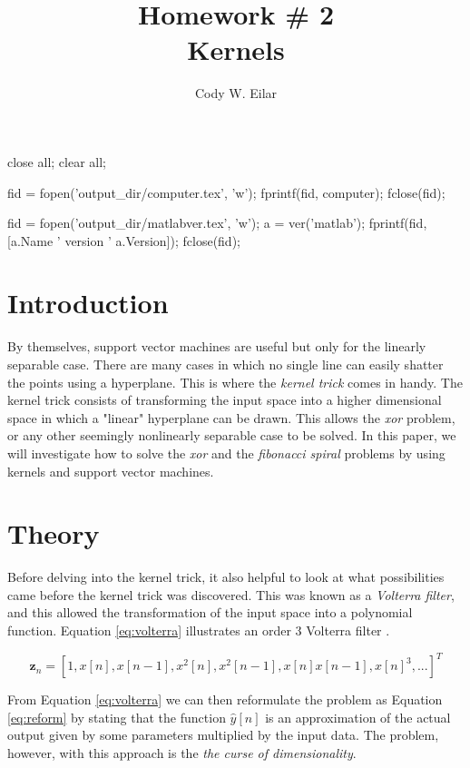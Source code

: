 \documentclass[11pt, twoside]{article}   	%
\title{Homework \# 2 \\ Kernels}
\author{Cody W. Eilar}
\newenvironment{matlab}{\comment}{\endcomment}
\begin{document}
\maketitle


\begin{matlab}
close all; 
clear all;

fid = fopen('output_dir/computer.tex', 'w'); 
fprintf(fid, computer); 
fclose(fid); 

fid = fopen('output_dir/matlabver.tex', 'w'); 
a = ver('matlab'); 
fprintf(fid, [a.Name ' version ' a.Version]); 
fclose(fid); 
\end{matlab}

\section{Introduction} 
By themselves, support vector machines are useful but only for the linearly separable case. There are many cases in which no single line can easily shatter the points 
using a hyperplane. This is where the \textit{kernel trick} comes in handy. The kernel trick consists of transforming the input space into a higher dimensional space in which a "linear"
hyperplane can be drawn. This allows the \textit{xor} problem, or any other seemingly nonlinearly separable case to be solved. In this paper, we will investigate how to solve the \textit{xor} 
and the \textit{fibonacci spiral} problems by using kernels and support vector machines. 


\section{Theory}
Before delving into the kernel trick, it also helpful to look at what possibilities came before the kernel trick was discovered. This was known as a \textit{Volterra filter}, and this allowed
the transformation of the input space into a polynomial function. Equation \ref{eq:volterra} illustrates an order 3 Volterra filter \cite{volterra}.


\begin{equation}
\mathbf{z}_n = [1, x[n], x[n-1], x^2[n], x^2[n-1], x[n] x[n-1], x[n]^3, ...]^T
\label{eq:volterra}
\end{equation}

From Equation \ref{eq:volterra} we can then reformulate the problem as Equation \ref{eq:reform} by stating that the function $\hat{y}[n]$ is an approximation of the actual output
given by some parameters multiplied by the input data. The problem, however, with this approach is the \textit{the curse of dimensionality}.
\end{document}

